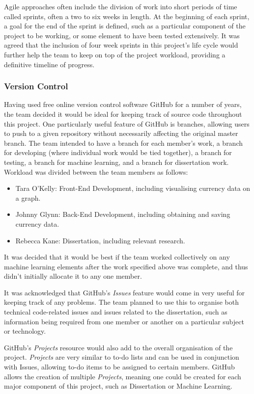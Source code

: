 Agile approaches often include the division of work into short periods of time called sprints, often a two to six weeks in length. At the beginning of each sprint, a goal for the end of the sprint is defined, such as a particular component of the project to be working, or some element to have been tested extensively. It was agreed that the inclusion of four week sprints in this project's life cycle would further help the team to keep on top of the project workload, providing a definitive timeline of progress.

\subsubsection{Version Control}
Having used free online version control software GitHub for a number of years, the team decided it would be ideal for keeping track of source code throughout this project. One particularly useful feature of GitHub is branches, allowing users to push to a given repository without necessarily affecting the original master branch. The team intended to have a branch for each member's work, a branch for developing (where individual work would be tied together), a branch for testing, a branch for machine learning, and a branch for dissertation work. Workload was divided between the team members as follows:

\begin{itemize}
    \item Tara O'Kelly: Front-End Development, including visualising currency data on a graph.
    \item Johnny Glynn: Back-End Development, including obtaining and saving currency data.
    \item Rebecca Kane: Dissertation, including relevant research.
\end{itemize}

It was decided that it would be best if the team worked collectively on any machine learning elements after the work specified above was complete, and thus didn't initially allocate it to any one member. 

It was acknowledged that GitHub's \textit{Issues} feature would come in very useful for keeping track of any problems. The team planned to use this to organise both technical code-related issues and issues related to the dissertation, such as information being required from one member or another on a particular subject or technology.

GitHub's \textit{Projects} resource would also add to the overall organisation of the project. \textit{Projects} are very similar to to-do lists and can be used in conjunction with Issues, allowing to-do items to be assigned to certain members. GitHub allows the creation of multiple \textit{Projects}, meaning one could be created for each major component of this project, such as Dissertation or Machine Learning.

